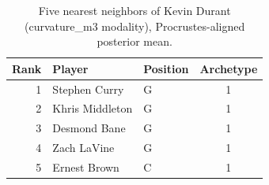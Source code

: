 \begin{table}[htbp]
  \centering\small
  \begin{tabular}{rllc}
    \toprule
    Rank & Player & Position & Archetype \\
    \midrule
    1 & Stephen Curry & G & 1 \\
    2 & Khris Middleton & G & 1 \\
    3 & Desmond Bane & G & 1 \\
    4 & Zach LaVine & G & 1 \\
    5 & Ernest Brown & C & 1 \\
    \bottomrule
  \end{tabular}
  \caption{Five nearest neighbors of Kevin Durant (curvature_m3 modality), Procrustes-aligned posterior mean.}
  \label{tab:Kevin_Durant_neighbors_curvature_m3}
\end{table}

